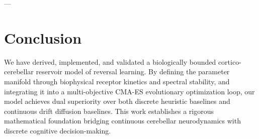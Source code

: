 \documentclass[11pt,twoside,a4paper]{article}
\begin{document}
---

\section{Conclusion}

We have derived, implemented, and validated a biologically bounded cortico-cerebellar reservoir model of reversal learning. By defining the parameter manifold through biophysical receptor kinetics and spectral stability, and integrating it into a multi-objective CMA-ES evolutionary optimization loop, our model achieves dual superiority over both discrete heuristic baselines and continuous drift diffusion baselines. This work establishes a rigorous mathematical foundation bridging continuous cerebellar neurodynamics with discrete cognitive decision-making.
\end{document}
